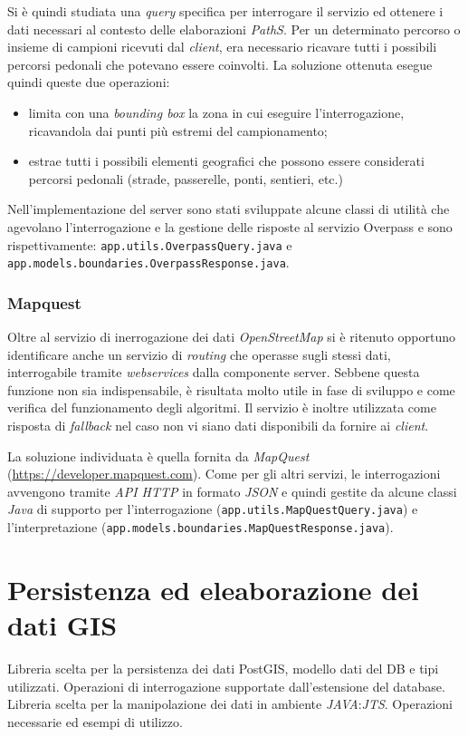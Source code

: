 Si è quindi studiata una \emph{query} specifica per interrogare il servizio ed ottenere i dati necessari al contesto delle elaborazioni \emph{PathS}. Per un determinato percorso o insieme di campioni ricevuti dal \emph{client}, era necessario ricavare tutti i possibili percorsi pedonali che potevano essere coinvolti. La soluzione ottenuta esegue quindi queste due operazioni:
\begin{itemize}
\item limita con una \emph{bounding box} la zona in cui eseguire l'interrogazione, ricavandola dai punti più estremi del campionamento;
\item estrae tutti i possibili elementi geografici che possono essere considerati percorsi pedonali (strade, passerelle, ponti, sentieri, etc.)
\end{itemize}
Nell'implementazione del server sono stati sviluppate alcune classi di utilità che agevolano l'interrogazione e la gestione delle risposte al servizio Overpass e sono rispettivamente: \texttt{app.\-utils.\-OverpassQuery.java} e \texttt{app.\-models.\-boundaries.\-OverpassResponse.java}.

\subsubsection{Mapquest}
Oltre al servizio di inerrogazione dei dati \emph{OpenStreetMap} si è ritenuto opportuno identificare anche un servizio di \emph{routing} che operasse sugli stessi dati, interrogabile tramite \emph{webservices} dalla componente server. Sebbene questa funzione non sia indispensabile, è risultata molto utile in fase di sviluppo e come verifica del funzionamento degli algoritmi. Il servizio è inoltre utilizzata come risposta di \emph{fallback} nel caso non vi siano dati disponibili da fornire ai \emph{client}.

La soluzione individuata è quella fornita da \emph{MapQuest} (\url{https://developer.mapquest.com}). Come per gli altri servizi, le interrogazioni avvengono tramite \emph{API HTTP} in formato \emph{JSON} e quindi gestite da alcune classi \emph{Java} di supporto per l'interrogazione (\texttt{app.\-utils.\-MapQuestQuery.java}) e l'interpretazione (\texttt{app.\-models.\-boundaries.\-MapQuestResponse.java}).


\section{Persistenza ed eleaborazione dei dati GIS}
Libreria scelta per la persistenza dei dati PostGIS, modello dati del DB e tipi utilizzati. Operazioni di interrogazione supportate dall'estensione del database.
Libreria scelta per la manipolazione dei dati in ambiente \emph{JAVA}:\emph{JTS}. Operazioni necessarie ed esempi di utilizzo. 

